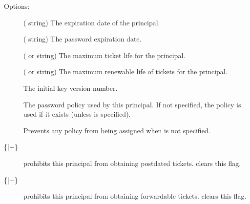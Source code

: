 \documentclass[letterpaper,10pt,english]{sphinxmanual}
\begin{document}
\sphinxAtStartPar
Options:
\begin{description}
\item[{ }] \leavevmode
\sphinxAtStartPar
( string) The expiration date of the principal.

\item[{ }] \leavevmode
\sphinxAtStartPar
( string) The password expiration date.

\item[{ }] \leavevmode
\sphinxAtStartPar
( or  string) The maximum ticket life
for the principal.

\item[{ }] \leavevmode
\sphinxAtStartPar
( or  string) The maximum renewable
life of tickets for the principal.

\item[{ }] \leavevmode
\sphinxAtStartPar
The initial key version number.

\item[{ }] \leavevmode
\sphinxAtStartPar
The password policy used by this principal.  If not specified, the
policy  is used if it exists (unless 
is specified).

\item[{}] \leavevmode
\sphinxAtStartPar
Prevents any policy from being assigned when  is not
specified.

\item[{\{\sphinxhyphen{}|+\}}] \leavevmode
\sphinxAtStartPar
{} prohibits this principal from obtaining
postdated tickets.   clears this flag.

\item[{\{\sphinxhyphen{}|+\}}] \leavevmode
\sphinxAtStartPar
{} prohibits this principal from obtaining
forwardable tickets.   clears this flag.


\end{description}
\end{document}
